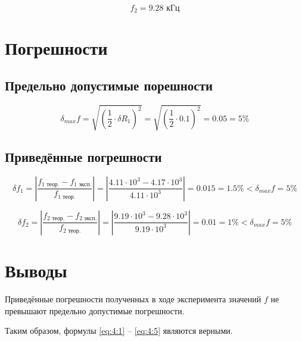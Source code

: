 \begin{displaymath}
	f_2 = 9.28 \text{ кГц}
\end{displaymath}


\section{Погрешности}

\subsection{Предельно допустимые порешности}

\begin{displaymath}
\delta_{max} f = \sqrt{\left(\frac{1}{2} \cdot \delta R_1 \right)^2} = \sqrt{\left(\frac{1}{2} \cdot 0.1 \right)^2} = 0.05 = 5 \%
\end{displaymath}

\subsection{Приведённые погрешности}

\begin{displaymath}
	\delta f_1 = \left|\frac{f_\text{1 теор.} - f_\text{1 эксп.}}{f_\text{1 теор.}} \right| = \left|\frac{4.11 \cdot 10^3 - 4.17 \cdot 10^3}{4.11 \cdot 10^3}\right| = 0.015 = 1.5\% < \delta_{max} f = 5\%
\end{displaymath}

\begin{displaymath}
	\delta f_2 = \left|\frac{f_\text{2 теор.} - f_\text{2 эксп.}}{f_\text{2 теор.}} \right| = \left|\frac{9.19 \cdot 10^3 - 9.28 \cdot 10^3}{9.19 \cdot 10^3}\right| = 0.01 = 1\% < \delta_{max} f = 5\%
\end{displaymath}

\section{Выводы}

Приведённые погрешности полученных в ходе эксперимента значений $f$ не превышают предельно допустимые погрешности.

Таким образом, формулы \ref{eq:4:1} -- \ref{eq:4:5} являются верными.

